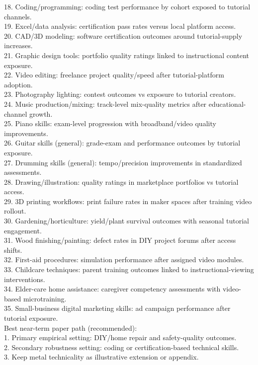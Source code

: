 \documentclass[11pt]{article}
\begin{document}
18. Coding/programming: coding test performance by cohort exposed to tutorial channels.\\
19. Excel/data analysis: certification pass rates versus local platform access.\\
20. CAD/3D modeling: software certification outcomes around tutorial-supply increases.\\
21. Graphic design tools: portfolio quality ratings linked to instructional content exposure.\\
22. Video editing: freelance project quality/speed after tutorial-platform adoption.\\
23. Photography lighting: contest outcomes vs exposure to tutorial creators.\\
24. Music production/mixing: track-level mix-quality metrics after educational-channel growth.\\
25. Piano skills: exam-level progression with broadband/video quality improvements.\\
26. Guitar skills (general): grade-exam and performance outcomes by tutorial exposure.\\
27. Drumming skills (general): tempo/precision improvements in standardized assessments.\\
28. Drawing/illustration: quality ratings in marketplace portfolios vs tutorial access.\\
29. 3D printing workflows: print failure rates in maker spaces after training video rollout.\\
30. Gardening/horticulture: yield/plant survival outcomes with seasonal tutorial engagement.\\
31. Wood finishing/painting: defect rates in DIY project forums after access shifts.\\
32. First-aid procedures: simulation performance after assigned video modules.\\
33. Childcare techniques: parent training outcomes linked to instructional-viewing interventions.\\
34. Elder-care home assistance: caregiver competency assessments with video-based microtraining.\\
35. Small-business digital marketing skills: ad campaign performance after tutorial exposure.\\

Best near-term paper path (recommended):\\
1. Primary empirical setting: DIY/home repair and safety-quality outcomes.\\
2. Secondary robustness setting: coding or certification-based technical skills.\\
3. Keep metal technicality as illustrative extension or appendix.\\
\end{document}
